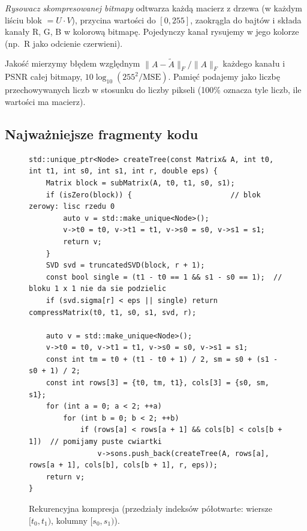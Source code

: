 \documentclass[11pt,a4paper]{article}
\begin{document}
\emph{Rysowacz skompresowanej bitmapy} odtwarza każdą macierz z drzewa (w każdym liściu blok $=U\cdot V$), przycina
wartości do $[0,255]$, zaokrągla do bajtów i składa kanały R, G, B w kolorową bitmapę. Pojedynczy kanał rysujemy
w jego kolorze (np.\ R jako odcienie czerwieni).

Jakość mierzymy błędem względnym $\|A-\tilde A\|_F/\|A\|_F$ każdego kanału i PSNR całej bitmapy,
$10\log_{10}(255^2/\mathrm{MSE})$. Pamięć podajemy jako liczbę przechowywanych liczb w stosunku do liczby pikseli
(100\% oznacza tyle liczb, ile wartości ma macierz).

\subsection{Najważniejsze fragmenty kodu}
\begin{figure}[H]
\centering
\begin{lstlisting}
std::unique_ptr<Node> createTree(const Matrix& A, int t0, int t1, int s0, int s1, int r, double eps) {
    Matrix block = subMatrix(A, t0, t1, s0, s1);
    if (isZero(block)) {                       // blok zerowy: lisc rzedu 0
        auto v = std::make_unique<Node>();
        v->t0 = t0, v->t1 = t1, v->s0 = s0, v->s1 = s1;
        return v;
    }
    SVD svd = truncatedSVD(block, r + 1);
    const bool single = (t1 - t0 == 1 && s1 - s0 == 1);  // bloku 1 x 1 nie da sie podzielic
    if (svd.sigma[r] < eps || single) return compressMatrix(t0, t1, s0, s1, svd, r);

    auto v = std::make_unique<Node>();
    v->t0 = t0, v->t1 = t1, v->s0 = s0, v->s1 = s1;
    const int tm = t0 + (t1 - t0 + 1) / 2, sm = s0 + (s1 - s0 + 1) / 2;
    const int rows[3] = {t0, tm, t1}, cols[3] = {s0, sm, s1};
    for (int a = 0; a < 2; ++a)
        for (int b = 0; b < 2; ++b)
            if (rows[a] < rows[a + 1] && cols[b] < cols[b + 1])  // pomijamy puste cwiartki
                v->sons.push_back(createTree(A, rows[a], rows[a + 1], cols[b], cols[b + 1], r, eps));
    return v;
}
\end{lstlisting}
\caption{Rekurencyjna kompresja (przedziały indeksów półotwarte: wiersze $[t_0,t_1)$, kolumny $[s_0,s_1)$).}
\end{figure}
\end{document}
